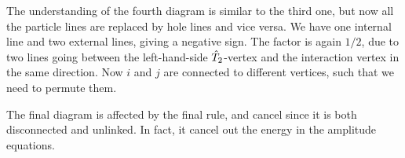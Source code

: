 The understanding of the fourth diagram is similar to the third one, but now all the particle lines are replaced by hole lines and vice versa. We have one internal line and two external lines, giving a negative sign. The factor is again $1/2$, due to two lines going between the left-hand-side $\hat{T}_2$-vertex and the interaction vertex in the same direction. Now $i$ and $j$ are connected to different vertices, such that we need to permute them. 


The final diagram is affected by the final rule, and cancel since it is both disconnected and unlinked. In fact, it cancel out the energy in the amplitude equations. \cite{shavitt}